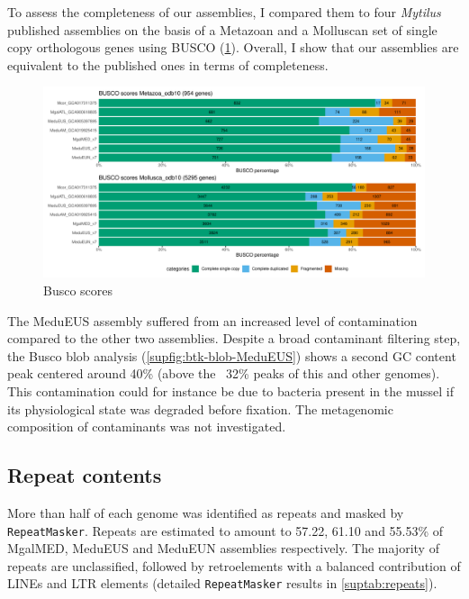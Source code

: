 \documentclass[11pt, a4paper]{article}
\begin{document}
\begin{landscape}
	
\end{landscape}


To assess the completeness of our assemblies, I compared them to four \textit{Mytilus} published assemblies on the basis of a Metazoan and a Molluscan set of single copy orthologous genes using BUSCO (\cref{fig:busco}).
Overall, I show that our assemblies are equivalent to the published ones in terms of completeness.

\begin{figure}[h]
	\includegraphics[width=\linewidth]{figures/Fig2_busco.pdf}
	\caption{Busco scores}
	\label{fig:busco}
\end{figure}

The MeduEUS assembly suffered from an increased level of contamination compared to the other two assemblies.
Despite a broad contaminant filtering step, the Busco blob analysis (\cref{supfig:btk-blob-MeduEUS})
shows a second GC content peak centered around 40\% (above the ~32\% peaks of this and other genomes).
This contamination could for instance be due to bacteria present in the mussel if its physiological state was degraded before fixation.
The metagenomic composition of contaminants was not investigated.

\subsection{Repeat contents}

More than half of each genome was identified as repeats and masked by \texttt{RepeatMasker}.
Repeats are estimated to amount to 57.22, 61.10 and 55.53\% of MgalMED, MeduEUS and MeduEUN assemblies respectively.
The majority of repeats are unclassified, followed by retroelements with a balanced contribution of LINEs and LTR elements
(detailed \texttt{RepeatMasker} results in \cref{suptab:repeats}).
\end{document}
